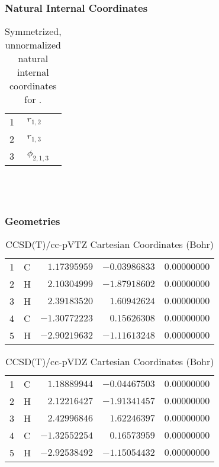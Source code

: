 \documentclass[10pt,oneside]{article}
\begin{document}
\clearpage

\subsubsection*{Natural Internal Coordinates}
\begin{table}[h!]
\centering
\caption{Symmetrized, unnormalized natural internal coordinates for .}
\small
\begin{tabular}{ll}
  1   & $r_{1,2}$ \\
  2   & $r_{1,3}$ \\
  3   & $\phi_{2,1,3}$ \\
\end{tabular}
\end{table}

\clearpage

\subsection{\ \ \ }

\subsubsection*{Geometries}
\begin{table}[h!]
\centering
\caption{CCSD(T)/cc-pVTZ Cartesian Coordinates (Bohr)}
\begin{tabular}{llrrr}
1  & C  & $ 1.17395959$ & $-0.03986833$ & $ 0.00000000$ \\
2  & H  & $ 2.10304999$ & $-1.87918602$ & $ 0.00000000$ \\
3  & H  & $ 2.39183520$ & $ 1.60942624$ & $ 0.00000000$ \\
4  & C  & $-1.30772223$ & $ 0.15626308$ & $ 0.00000000$ \\
5  & H  & $-2.90219632$ & $-1.11613248$ & $ 0.00000000$ \\
\end{tabular}
\end{table}

\begin{table}[h!]
\centering
\caption{CCSD(T)/cc-pVDZ Cartesian Coordinates (Bohr)}
\begin{tabular}{llrrr}
1  & C  & $ 1.18889944$ & $-0.04467503$ & $ 0.00000000$ \\
2  & H  & $ 2.12216427$ & $-1.91341457$ & $ 0.00000000$ \\
3  & H  & $ 2.42996846$ & $ 1.62246397$ & $ 0.00000000$ \\
4  & C  & $-1.32552254$ & $ 0.16573959$ & $ 0.00000000$ \\
5  & H  & $-2.92538492$ & $-1.15054432$ & $ 0.00000000$ \\
\end{tabular}
\end{table}
\end{document}
